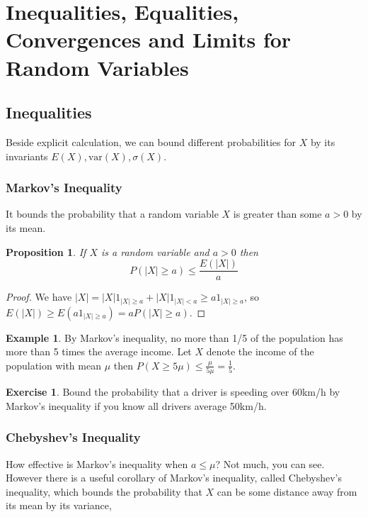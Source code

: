 \documentclass[12pt]{amsart}
\newtheorem{proposition}[theorem]{Proposition}
\theoremstyle{definition}
\newtheorem{example}[theorem]{Example}
\newtheorem{exercise}[theorem]{Exercise}
\begin{document}
\section{Inequalities, Equalities, Convergences and Limits for Random Variables}

\subsection{Inequalities} Beside explicit calculation, we can bound different probabilities for $X$ by its invariants $E(X), \text{var}(X), \sigma(X)$.

\subsubsection{Markov's Inequality} It bounds the probability that a random variable $X$ is greater than some $a > 0$ by its mean.

\begin{proposition} If $X$ is a random variable and $a > 0$ then
$$P(|X| \geq a) \leq \frac{E(|X|)}{a}$$
\end{proposition} 
\begin{proof}  We have $|X| = |X|1_{|X| \geq a} + |X|1_{|X| < a} \geq a1_{|X| \geq a}$, so $E(|X|) \geq E(a1_{|X| \geq a}) = aP(|X| \geq a)$.
\end{proof}

\begin{example} \label{markov_1_5_population} By Markov's inequality, no more than 1/5 of the population has more than 5 times the average income. Let $X$ denote the income of the population with mean $\mu$ then $P(X \geq 5\mu) \leq \frac{\mu}{5\mu} = \frac{1}{5}$.
\end{example}

\begin{exercise} Bound the probability that a driver is speeding over 60km/h by Markov's inequality if you know all drivers average 50km/h.
\end{exercise}

\subsubsection{Chebyshev's Inequality} How effective is Markov's inequality when $a \leq \mu$? Not much, you can see. However there is a useful corollary of Markov's inequality, called Chebyshev's inequality, which bounds the probability that $X$ can be some distance away from its mean by its variance,
\end{document}
